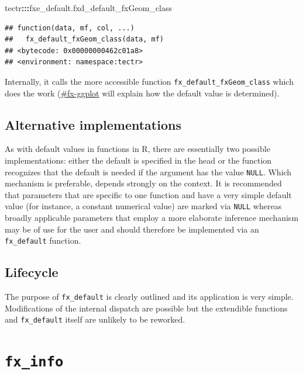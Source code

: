 \documentclass[]{report}
\newenvironment{Shaded}{\begin{snugshade}}{\end{snugshade}}
\newcommand{\OperatorTok}[1]{\textcolor[rgb]{0.81,0.36,0.00}{\textbf{#1}}}
\newcommand{\NormalTok}[1]{#1}
\theoremstyle{definition}
\theoremstyle{definition}
\theoremstyle{definition}
\theoremstyle{remark}
\begin{document}
\begin{Shaded}
\begin{Highlighting}[]
\NormalTok{tectr}\OperatorTok{:::}\NormalTok{fxe_default.fxd_default_fxGeom_class}
\end{Highlighting}
\end{Shaded}

\begin{verbatim}
## function(data, mf, col, ...)
##   fx_default_fxGeom_class(data, mf)
## <bytecode: 0x00000000462c01a8>
## <environment: namespace:tectr>
\end{verbatim}

Internally, it calls the more accessible function
\texttt{fx\_default\_fxGeom\_class} which does the work
(\href{\%60fx_ggplot\%60}{\#fx-ggplot} will explain how the default
value is determined).

\subsection{Alternative
implementations}\label{alternative-implementations}

As with default values in functions in R, there are essentially two
possible implementations: either the default is specified in the head or
the function recognizes that the default is needed if the argument has
the value \texttt{NULL}. Which mechanism is preferable, depends strongly
on the context. It is recommended that parameters that are specific to
one function and have a very simple default value (for instance, a
constant numerical value) are marked via \texttt{NULL} whereas broadly
applicable parameters that employ a more elaborate inference mechanism
may be of use for the user and should therefore be implemented via an
\texttt{fx\_default} function.

\subsection{Lifecycle}\label{lifecycle}

The purpose of \texttt{fx\_default} is clearly outlined and its
application is very simple. Modifications of the internal dispatch are
possible but the extendible functions and \texttt{fx\_default} itself
are unlikely to be reworked.

\section{\texorpdfstring{\texttt{fx\_info}}{fx\_info}}\label{fx_info}
\end{document}
